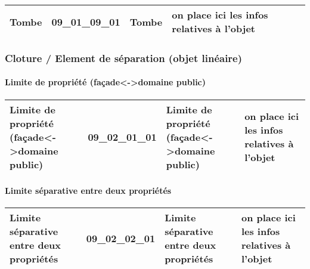 \documentclass[12pt,titlepage,oneside]{book}
\begin{document}
\renewcommand{\arraystretch}{1.2}
\begin{supertabular}{|p{10cm}|c|p{13cm}|p{12cm}|}
 Tombe & 09\_01\_09\_01 & Tombe & on place ici les infos relatives à l'objet\\
\hline
\end{supertabular}
\begin{figure}[h!]
  \hfill         %
\end{figure}

\subsubsection{\large Cloture / Element de séparation (objet linéaire)}
\paragraph{Limite de propriété (façade<->domaine public)}
\noindent
\vspace{\baselineskip}

\renewcommand{\arraystretch}{1.2}
\begin{supertabular}{|p{10cm}|c|p{13cm}|p{12cm}|}
 Limite de propriété (façade<->domaine public) & 09\_02\_01\_01 & Limite de propriété (façade<->domaine public) & on place ici les infos relatives à l'objet\\
\hline
\end{supertabular}
\begin{figure}[h!]
  \hfill         %
\end{figure}


\paragraph{Limite séparative entre deux propriétés}
\noindent
\vspace{\baselineskip}

\renewcommand{\arraystretch}{1.2}
\begin{supertabular}{|p{10cm}|c|p{13cm}|p{12cm}|}
 Limite séparative entre deux propriétés & 09\_02\_02\_01 & Limite séparative entre deux propriétés & on place ici les infos relatives à l'objet\\
\hline
\end{supertabular}
\begin{figure}[h!]
  \hfill         %
\end{figure}
\end{document}
